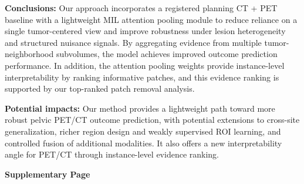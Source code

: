 \documentclass[a4paper]{article}
\begin{document}
\textbf{Conclusions:}
Our approach incorporates a registered planning CT + PET baseline with a lightweight MIL attention pooling module to reduce reliance on a single tumor-centered view and improve robustness under lesion heterogeneity and structured nuisance signals. By aggregating evidence from multiple tumor-neighborhood subvolumes, the model achieves improved outcome prediction performance. In addition, the attention pooling weights provide instance-level interpretability by ranking informative patches, and this evidence ranking is supported by our top-ranked patch removal analysis.

\textbf{Potential impacts:}
Our method provides a lightweight path toward more robust pelvic PET/CT outcome prediction, with potential extensions to cross-site generalization, richer region design and weakly supervised ROI learning, and controlled fusion of additional modalities. It also offers a new interpretability angle for PET/CT through instance-level evidence ranking.


\FloatBarrier
\newpage
\thispagestyle{plain}

\begin{center}
{\large\bfseries Supplementary Page}
\end{center}
\vspace{-0.2em}

\FloatBarrier  %
\end{document}
